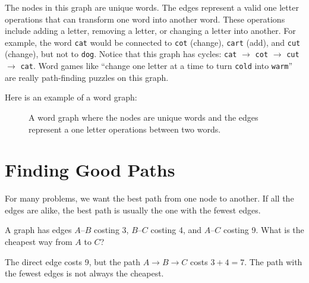 \begin{Answer}[ref={ex:word_graph}]

The nodes in this graph are unique words. The edges represent a valid one letter operations that can transform one word into another word. These operations include adding a letter, removing a letter, or changing a letter into another. For example, the word \texttt{cat} would be connected to \texttt{cot} (change), \texttt{cart} (add), and \texttt{cut} (change), but not to \texttt{dog}. Notice that this graph has cycles: \texttt{cat} $\to$ \texttt{cot}
$\to$ \texttt{cut} $\to$ \texttt{cat}. Word games like ``change one letter
at a time to turn \texttt{cold} into \texttt{warm}'' are really
path-finding puzzles on this graph.

Here is an example of a word graph:
\begin{figure}[H]
  \centering
  \caption{A word graph where the nodes are unique words and the edges represent a one letter operations between two words.}
  \label{fig:word_graph_ex}
\end{figure}
\end{Answer}
\section{Finding Good Paths}

For many problems, we want the best path from one node to another. If all
the edges are alike, the best path is usually the one with the fewest
edges.

\begin{Worked}
\begin{Problem}
A graph has edges $A$--$B$ costing 3, $B$--$C$
costing 4, and $A$--$C$ costing 9. What is the cheapest way from $A$ to
$C$?
\end{Problem}
\begin{Solution}
The direct edge costs 9, but the path
$A \to B \to C$ costs $3 + 4 = 7$. The path with the fewest edges is not
always the cheapest.
\end{Solution}
\end{Worked}


